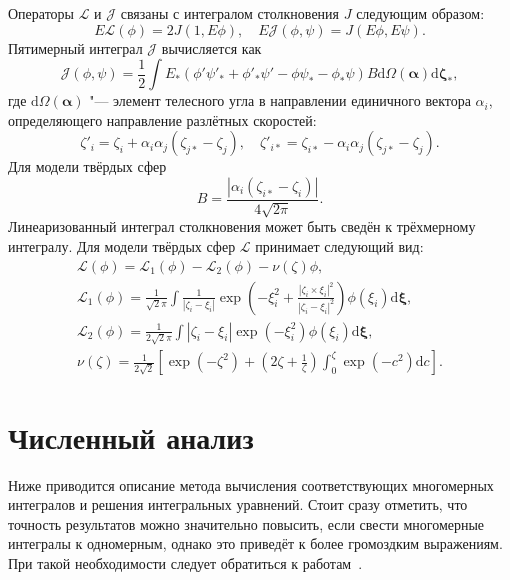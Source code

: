 \documentclass[a4paper,12pt]{article}
\newcommand{\dd}{\mathrm{d}}
\begin{document}
Операторы \(\mathcal{L}\) и \(\mathcal{J}\) связаны с интегралом столкновения \(J\) следующим образом:
\begin{equation}\label{eq:mathcalLJ}
    E\mathcal{L}(\phi) = 2J(1, E\phi), \quad E\mathcal{J}(\phi, \psi) = J(E\phi, E\psi).
\end{equation}
Пятимерный интеграл \(\mathcal{J}\) вычисляется как
\begin{equation}\label{eq:mathcalJ}
    \mathcal{J}(\phi,\psi) = \frac12 \int E_*(\phi'\psi'_* + \phi'_*\psi' - \phi\psi_* - \phi_*\psi) B
    \dd \Omega(\boldsymbol{\alpha}) \boldsymbol{\dd \zeta_*},
\end{equation}
где \(\dd \Omega(\boldsymbol{\alpha})\) "--- элемент телесного угла в направлении единичного вектора \(\alpha_i\),
определяющего направление разлётных скоростей:
\begin{equation}\label{scatter_velocities}
    \zeta'_i = \zeta_i + \alpha_i\alpha_j(\zeta_{j*}-\zeta_j), \quad
    \zeta'_{i*} = \zeta_{i*} - \alpha_i\alpha_j(\zeta_{j*}-\zeta_j).
\end{equation}
Для модели твёрдых сфер
\begin{equation}
    B = \frac{|\alpha_i(\zeta_{i*}-\zeta_i)|}{4\sqrt{2\pi}}.
\end{equation}
Линеаризованный интеграл столкновения может быть сведён к трёхмерному интегралу.
Для модели твёрдых сфер \(\mathcal{L}\) принимает следующий вид:
\begin{gather}\label{eq:linear_canonic}
    \mathcal{L}(\phi) = \mathcal{L}_1(\phi) - \mathcal{L}_2(\phi) - \nu(\zeta)\phi, \\[6pt]
    \mathcal{L}_1(\phi) = \frac1{\sqrt2\pi} \int \frac1{|\zeta_i-\xi_i|}
        \exp\left(-\xi_i^2 + \frac{|\zeta_i\times\xi_i|^2}{|\zeta_i-\xi_i|^2}\right) \phi(\xi_i) \boldsymbol{\dd\xi}, \\
    \mathcal{L}_2(\phi) = \frac1{2\sqrt2\pi} \int |\zeta_i-\xi_i|\exp\left(-\xi_i^2\right) \phi(\xi_i) \boldsymbol{\dd\xi}, \\
    \nu(\zeta) = \frac1{2\sqrt2}\left[ \exp(-\zeta^2) + \left(2\zeta+\frac1\zeta\right) \int_0^\zeta\exp(-c^2)\dd{c} \right].
\end{gather}

\section{Численный анализ}

Ниже приводится описание метода вычисления соответствующих многомерных интегралов
и решения интегральных уравнений.
Стоит сразу отметить, что точность результатов можно значительно повысить,
если свести многомерные интегралы к одномерным,
однако это приведёт к более громоздким выражениям.
При такой необходимости следует обратиться к работам~\cite{Pekeris1957, Ohwada1992}.
\end{document}
